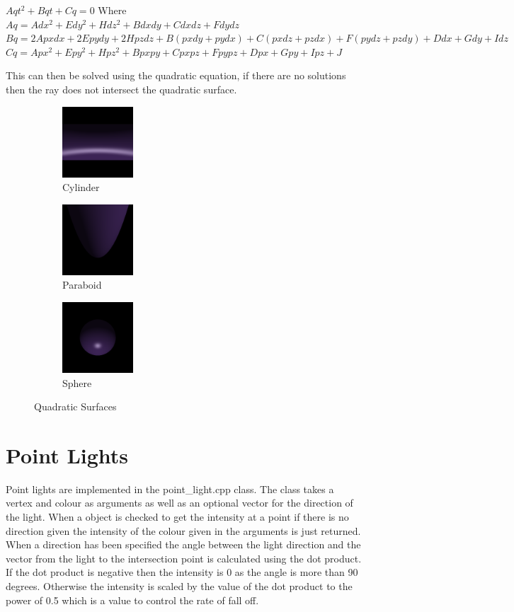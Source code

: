 \documentclass{article}
\begin{document}
\begin{center}
$Aqt^2 + Bqt + Cq = 0$ Where
$Aq = Adx^2 + Edy^2 + Hdz^2 + Bdxdy + Cdxdz + Fdydz$
$Bq = 2Apxdx + 2Epydy + 2Hpzdz + B(pxdy + pydx) + C(pxdz + pzdx) + F(pydz + pzdy) + Ddx + Gdy + Idz$
$Cq = Apx^2 + Epy^2 + Hpz^2 + Bpxpy + Cpxpz + Fpypz + Dpx + Gpy + Ipz + J$
\end{center}

This can then be solved using the quadratic equation, if there are no solutions
then the ray does not intersect the quadratic surface.

\begin{figure}[H]
\centering
\begin{subfigure}{.3\textwidth}
  \centering
  \includegraphics[width=100px]{Images/quadCylinder.png}
  \caption{Cylinder}
\end{subfigure}%
\begin{subfigure}{.3\textwidth}
  \centering
  \includegraphics[width=100px]{Images/quadParaboid.png}
  \caption{Paraboid}
\end{subfigure}
\begin{subfigure}{.3\textwidth}
  \centering
  \includegraphics[width=100px]{Images/quadSphere.png}
  \caption{Sphere}
\end{subfigure}
\caption{Quadratic Surfaces}
\label{fig:quadsurface}
\end{figure}

\section{Point Lights}

Point lights are implemented in the point\_light.cpp class. The class takes a vertex
and colour as arguments as well as an optional vector for the direction of the light.
When a object is checked to get the intensity at a point if there is no direction
given the intensity of the colour given in the arguments is just returned.
When a direction has been specified the angle between the light direction and the
vector from the light to the intersection point is calculated using the dot product.
If the dot product is negative then the intensity is 0 as the angle is more than
90 degrees. Otherwise the intensity is scaled by the value of the dot product
to the power of 0.5 which is a value to control the rate of fall off.
\end{document}
